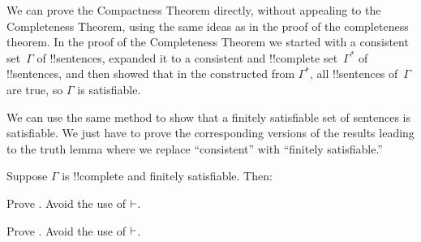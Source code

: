 \documentclass[../../../include/open-logic-section]{subfiles}
\begin{document}
      {}
      {}


We can prove the Compactness Theorem directly, without appealing to
the Completeness Theorem, using the same ideas as in the proof of the
completeness theorem.  In the proof of the Completeness Theorem we
started with a consistent set~$\Gamma$ of !!{sentence}s, expanded it
to a consistent and !!{complete}
set~$\Gamma^*$ of !!{sentence}s, and then showed that in the
constructed from $\Gamma^*$, all !!{sentence}s of~$\Gamma$ are true,
so $\Gamma$ is satisfiable.

We can use the same method to show that a finitely satisfiable set of
sentences is satisfiable. We just have to prove the corresponding
versions of the results leading to the truth lemma where we replace
``consistent'' with ``finitely satisfiable.''

\begin{prop}
Suppose $\Gamma$ is !!{complete} and finitely satisfiable. Then:
\begin{enumerate}


\end{enumerate}
\end{prop}

\begin{prob}
Prove . Avoid the use of $\Proves$.
\end{prob}
\tagendprob

\begin{prob}
Prove . Avoid the use of $\Proves$.
\end{prob}
\tagendprob

\end{document}
